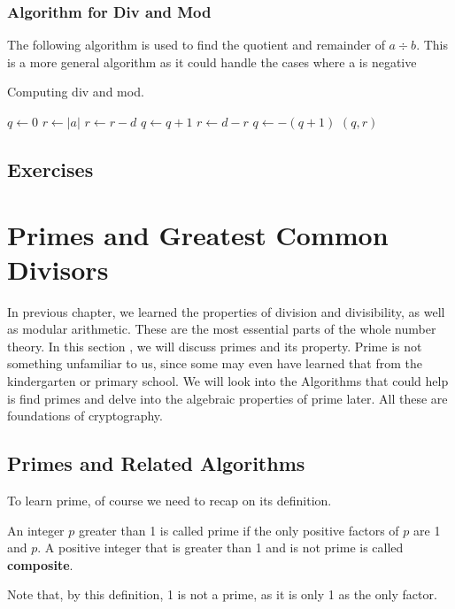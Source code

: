     \subsubsection*{Algorithm for Div and Mod}
        The following algorithm is used to find the quotient and remainder of $a \div b$.
        This is a more general algorithm as it could handle the cases where a is negative
    \begin{algorithm}
        \caption{Computing div and mod.}
        \begin{algorithmic}
            \State $q \gets 0$
            \State $r \gets |a|$
                \State $r \gets r - d$
                \State $q \gets q + 1$
            \EndWhile
                \State $r \gets d - r$
                \State $q \gets -(q + 1)$
            \EndIf
            \State \Return $(q, r)$ 
        \EndProcedure
        \end{algorithmic}
        \end{algorithm}

    \subsection{Exercises}



\section{Primes and Greatest Common Divisors}
        In previous chapter, we learned the properties of division and divisibility, as well as
        modular arithmetic. These are the most essential parts of the whole number theory. In this section
        , we will discuss primes and its property. Prime is not something unfamiliar to us, since some may
        even have learned that from the kindergarten or primary school. We will look into the Algorithms
        that could help is find primes and delve into the algebraic properties of prime later. All these
        are foundations of cryptography.
    \subsection{Primes and Related Algorithms}
        To learn prime, of course we need to recap on its definition.
        \begin{definition}  
            An integer $p$ greater than 1 is called prime if the only positive factors of $p$ are 1 and $p$.
            A positive integer that is greater than 1 and is not prime is called \textbf{composite}.
        \end{definition}    
        Note that, by this definition, 1 is not a prime, as it is only 1 as the only factor.

